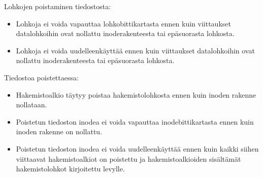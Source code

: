 Lohkojen poistaminen tiedostosta:
\begin{itemize}
    \item{Lohkoja ei voida vapauttaa lohkobittikartasta ennen kuin viittaukset datalohkoihin ovat nollattu inoderakenteesta tai epäsuorasta lohkosta.}
    \item{Lohkoja ei voida uudelleenkäyttää ennen kuin viittaukset datalohkoihin ovat nollattu inoderakenteesta tai epäsuorasta lohkosta.}
\end{itemize}
Tiedostoa poistettaessa:
\begin{itemize}
    \item{Hakemistoalkio täytyy poistaa hakemistolohkosta ennen kuin inoden rakenne nollataan.}
    \item{Poistetun tiedoston inodea ei voida vapauttaa inodebittikartasta ennen kuin inoden rakenne on nollattu.}
    \item{Poistetun tiedoston inodea ei voida uudelleenkäyttää ennen kuin kaikki siihen viittaavat hakemistoalkiot on poistettu ja hakemistoalkioiden sisältämät hakemistolohkot kirjoitettu levylle.}
\end{itemize}


